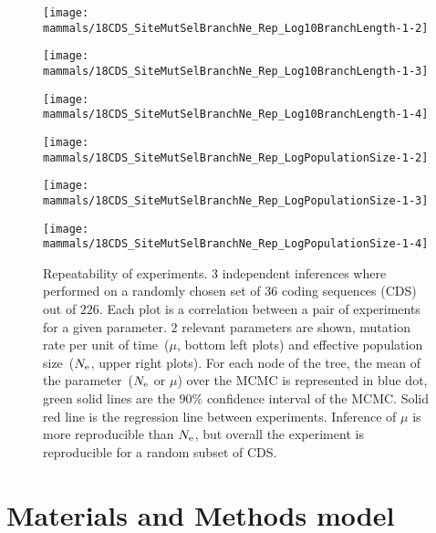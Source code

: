 \begin{figure}[H]
	\centering
	\begin{minipage}{0.32\linewidth}
		\texttt{[image: mammals/18CDS\_SiteMutSelBranchNe\_Rep\_Log10BranchLength-1-2]}
	\end{minipage}	\hfill
	\begin{minipage}{0.32\linewidth}
		\texttt{[image: mammals/18CDS\_SiteMutSelBranchNe\_Rep\_Log10BranchLength-1-3]}
	\end{minipage}	\hfill
	\begin{minipage}{0.32\linewidth}
		\texttt{[image: mammals/18CDS\_SiteMutSelBranchNe\_Rep\_Log10BranchLength-1-4]}
	\end{minipage}
	\begin{minipage}{0.32\linewidth}
		\texttt{[image: mammals/18CDS\_SiteMutSelBranchNe\_Rep\_LogPopulationSize-1-2]}
	\end{minipage}	\hfill
	\begin{minipage}{0.32\linewidth}
		\texttt{[image: mammals/18CDS\_SiteMutSelBranchNe\_Rep\_LogPopulationSize-1-3]}
	\end{minipage}	\hfill
	\begin{minipage}{0.32\linewidth}
		\texttt{[image: mammals/18CDS\_SiteMutSelBranchNe\_Rep\_LogPopulationSize-1-4]}
	\end{minipage}
	\caption[Repeatability of experiments]{
		Repeatability of experiments.
		$3$ independent inferences where performed on a randomly chosen set of $36$ coding sequences (CDS) out of $226$.
		Each plot is a correlation between a pair of experiments for a given parameter.
		$2$ relevant parameters are shown, mutation rate per unit of time~($\mu$, bottom left plots) and effective population size~($N_{\mathrm{e}}$, upper right plots).
		For each node of the tree, the mean of the parameter~($N_{\mathrm{e}}$ or $\mu$) over the MCMC is represented in blue dot, green solid lines are the $90\%$ confidence interval of the MCMC.
		Solid red line is the regression line between experiments.
		Inference of $\mu$ is more reproducible than $N_{\mathrm{e}}$, but overall the experiment is reproducible for a random subset of CDS.
	}
	\label{fig:mammals_repeatability}
\end{figure}

\section{Materials and Methods model}
\label{sec:Mat&Met}

